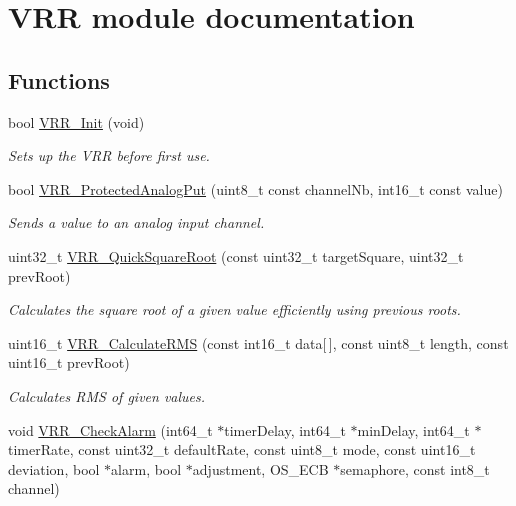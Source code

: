 \hypertarget{group___v_r_r__module}{}\section{V\+R\+R module documentation}
\label{group___v_r_r__module}
\subsection*{Functions}
\begin{DoxyCompactItemize}
\item 
bool \hyperlink{group___v_r_r__module_ga756bc6b6907a4561fe65c47e79fcac7a}{V\+R\+R\+\_\+\+Init} (void)
\begin{DoxyCompactList}\small\item\em Sets up the V\+R\+R before first use. \end{DoxyCompactList}\item 
bool \hyperlink{group___v_r_r__module_ga93027d44790f5625dc76fe8546c9692b}{V\+R\+R\+\_\+\+Protected\+Analog\+Put} (uint8\+\_\+t const channel\+Nb, int16\+\_\+t const value)
\begin{DoxyCompactList}\small\item\em Sends a value to an analog input channel. \end{DoxyCompactList}\item 
uint32\+\_\+t \hyperlink{group___v_r_r__module_gaf7bfe3281cde13a415309080ff5b0dc4}{V\+R\+R\+\_\+\+Quick\+Square\+Root} (const uint32\+\_\+t target\+Square, uint32\+\_\+t prev\+Root)
\begin{DoxyCompactList}\small\item\em Calculates the square root of a given value efficiently using previous roots. \end{DoxyCompactList}\item 
uint16\+\_\+t \hyperlink{group___v_r_r__module_ga133f79b2a87bb1e8c5ec256642b2e0d5}{V\+R\+R\+\_\+\+Calculate\+R\+M\+S} (const int16\+\_\+t data\mbox{[}$\,$\mbox{]}, const uint8\+\_\+t length, const uint16\+\_\+t prev\+Root)
\begin{DoxyCompactList}\small\item\em Calculates R\+M\+S of given values. \end{DoxyCompactList}\item 
void \hyperlink{group___v_r_r__module_ga19d2f6b20d6ec746b143317ea8add0db}{V\+R\+R\+\_\+\+Check\+Alarm} (int64\+\_\+t $\ast$timer\+Delay, int64\+\_\+t $\ast$min\+Delay, int64\+\_\+t $\ast$timer\+Rate, const uint32\+\_\+t default\+Rate, const uint8\+\_\+t mode, const uint16\+\_\+t deviation, bool $\ast$alarm, bool $\ast$adjustment, O\+S\+\_\+\+E\+C\+B $\ast$semaphore, const int8\+\_\+t channel)

\end{DoxyCompactItemize}
